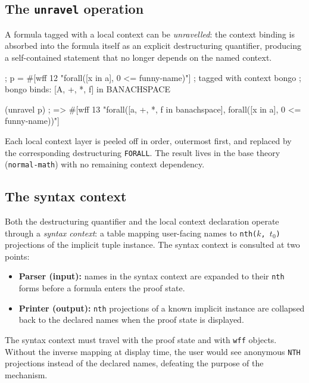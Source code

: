 \documentclass{amsbook}[openany]
\theoremstyle{definition}
\theoremstyle{remark}
\theoremstyle{remark}
\begin{document}
\subsection{The \texttt{unravel} operation}

A formula tagged with a local context can be \emph{unravelled}: the
context binding is absorbed into the formula itself as an explicit
destructuring quantifier, producing a self-contained statement that no
longer depends on the named context.

\begin{VNBsnip}
; p = #[wff 12 "forall([x in a], 0 <= funny-name)"]   ; tagged with context bongo
; bongo binds: [A, +, *, f] in BANACHSPACE

(unravel p)
; => #[wff 13 "forall([a, +, *, f in banachspace], forall([x in a], 0 <= funny-name))"]
\end{VNBsnip}

Each local context layer is peeled off in order, outermost first, and
replaced by the corresponding destructuring \texttt{FORALL}.  The result
lives in the base theory (\texttt{normal-math}) with no remaining
context dependency.

\subsection{The syntax context}

Both the destructuring quantifier and the local context declaration
operate through a \emph{syntax context}: a table mapping user-facing
names to \texttt{nth($k$, $t_0$)} projections of the implicit tuple
instance.  The syntax context is consulted at two points:

\begin{itemize}[label=\textendash, leftmargin=1cm]
\item \textbf{Parser (input):} names in the syntax context are expanded
  to their \texttt{nth} forms before a formula enters the proof state.
\item \textbf{Printer (output):} \texttt{nth} projections of a known
  implicit instance are collapsed back to the declared names when the
  proof state is displayed.
\end{itemize}

The syntax context must travel with the proof state and with
\texttt{wff} objects.  Without the inverse mapping at display
time, the user would see anonymous \texttt{NTH} projections instead of
the declared names, defeating the purpose of the mechanism.
\end{document}
